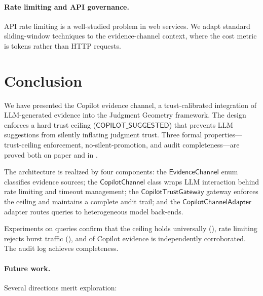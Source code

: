 \documentclass[11pt]{article}
\newcommand{\CopCh}{\mathsf{CopilotChannel}}
\newcommand{\EvCh}{\mathsf{EvidenceChannel}}
\newcommand{\CopAdapt}{\mathsf{CopilotChannelAdapter}}
\newcommand{\CopGate}{\mathsf{CopilotTrustGateway}}
\newcommand{\TrustCeil}{\mathsf{COPILOT\_SUGGESTED}}
\begin{document}
\paragraph{Rate limiting and API governance.}
API rate limiting \cite{nayak2024rate,sharif2015api} is
a well-studied problem in web services.  We adapt
standard sliding-window techniques to the evidence-channel
context, where the cost metric is tokens rather than
HTTP requests.

\section{Conclusion}
\label{sec:conclusion}

We have presented the Copilot evidence channel, a trust-calibrated
integration of LLM-generated evidence into the Judgment Geometry
framework.  The design enforces a hard trust ceiling
($\TrustCeil$) that prevents LLM suggestions from silently
inflating judgment trust.  Three formal properties---trust-ceiling
enforcement, no-silent-promotion, and audit completeness---are
proved both on paper and in \LEAN.

The architecture is realized by four components:
the $\EvCh$ enum classifies evidence sources;
the $\CopCh$ class wraps LLM interaction behind rate limiting
and timeout management;
the $\CopGate$ gateway enforces the ceiling and maintains
a complete audit trail;
and the $\CopAdapt$ adapter routes queries to heterogeneous
model back-ends.

Experiments on \ppLXXXVIIItotalQueries{} queries confirm that
the ceiling holds universally (\ppLXXXVIIIceilingHeldPct),
rate limiting rejects burst traffic
(\ppLXXXVIIIrateLimitHitPct), and \ppLXXXVIIIcorrobRate{} of
Copilot evidence is independently corroborated.  The audit
log achieves \ppLXXXVIIIauditComplete{} completeness.

\paragraph{Future work.}
Several directions merit exploration:
\end{document}
